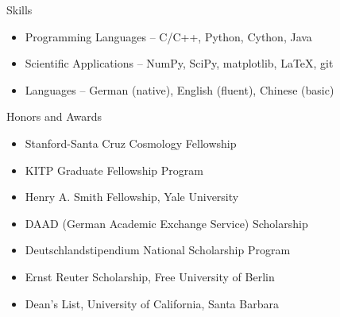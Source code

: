 \documentclass[11pt]{resume} %
\begin{document}
\begin{rSection}{Skills}
  \begin{itemize}[leftmargin=1.0cm, topsep=0pt,itemsep=0pt,partopsep=0pt, parsep=0pt]
    \item Programming Languages – C/C++, Python, Cython, Java
    \item Scientific Applications – NumPy, SciPy, matplotlib, LaTeX, git
    \item Languages – German (native), English (fluent), Chinese (basic)
  \end{itemize}
\end{rSection}

\begin{rSection}{Honors and Awards}
  \begin{itemize}[leftmargin=1.0cm, topsep=0pt,itemsep=0pt,partopsep=0pt, parsep=0pt]
    \item Stanford-Santa Cruz Cosmology Fellowship
    \item KITP Graduate Fellowship Program
    \item Henry A. Smith Fellowship, Yale University
    \item DAAD (German Academic Exchange Service) Scholarship
    \item Deutschlandstipendium National Scholarship Program
    \item Ernst Reuter Scholarship, Free University of Berlin
    \item Dean's List, University of California, Santa Barbara
  \end{itemize}
\end{rSection}
\end{document}
